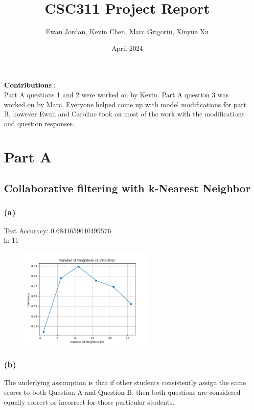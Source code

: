 \documentclass{article}
\title{CSC311 Project Report}
\author{Ewan Jordan, Kevin Chen, Marc Grigoriu, Xinyue Xu}
\date{April 2024}
\begin{document}
\maketitle
$\bold{Contributions:}$\\
Part A questions 1 and 2 were worked on by Kevin. Part A question 3 was worked on by Marc. Everyone helped come up with model modifications for part B, however Ewan and Caroline took on most of the work with the modifications and question responses.

\section{Part A}
\subsection{Collaborative filtering with k-Nearest Neighbor}
\subsubsection{(a)}
Test Accuracy: 0.6841659610499576\\
k: 11\\

\begin{figure}[H]
\centering
\includegraphics[width=0.6\textwidth]{figures/q1a.png}\\
\end{figure}
\subsubsection{(b)}
The underlying assumption is that if other students consistently assign the same scores to both Question A and Question B, then both questions are considered equally correct or incorrect for those particular students.\\
\\
\end{document}
